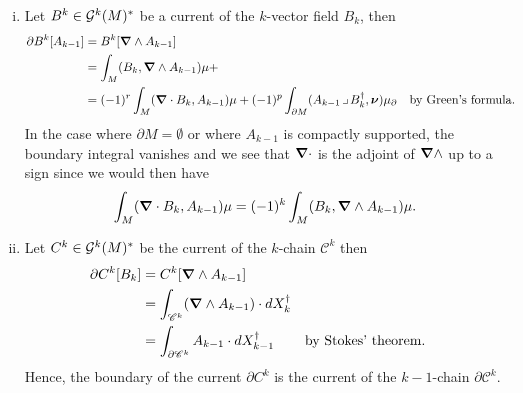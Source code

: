 \documentclass{article}
\begin{document}
\begin{enumerate}[i.]
    \item Let $B^{k}\in \mathcal{G}^k(M)^*$ be a current of the $k$-vector field $B_{k}$, then 
\begin{align}
    \partial B^k[A_{k-1}]&= B^k[\boldsymbol{\nabla} \wedge A_{k-1}]\\
    &= \int_M(B_k,\boldsymbol{\nabla} \wedge A_{k-1}) \mu + \\
    &=(-1)^r \int_M(\boldsymbol{\nabla} \cdot B_k, A_{k-1}) \mu + (-1)^p \int_{\partial M} (A_{k-1} \hspace*{.5mm}\lrcorner \hspace*{.5mm} B_k^\dagger,\boldsymbol{\nu}) \mu_\partial && \textrm{by Green's formula.}
\end{align}
In the case where $\partial M = \emptyset$ or where $A_{k-1}$ is compactly supported, the boundary integral vanishes and we see that $\boldsymbol{\nabla} \cdot$ is the adjoint of $\boldsymbol{\nabla} \wedge$ up to a sign since we would then have
\begin{equation}
\int_M (\boldsymbol{\nabla} \cdot B_k,A_{k-1}) \mu= (-1)^k \int_M (B_k,\boldsymbol{\nabla} \wedge A_{k-1}) \mu.
\end{equation}

    \item Let $C^k \in \mathcal{G}^k(M)^*$ be the current of the $k$-chain $\mathscr{C}^k$ then 
    \begin{align}
        \partial C^k [B_k]&= C^k[\boldsymbol{\nabla} \wedge A_{k-1}]\\
            &= \int_{\mathscr{C}^k} (\boldsymbol{\nabla} \wedge A_{k-1}) \cdot dX_k^\dagger\\
            &= \int_{\partial \mathscr{C}^k} A_{k-1} \cdot dX_{k-1}^\dagger && \textrm{by Stokes' theorem.}
    \end{align}
    Hence, the boundary of the current $\partial C^k$ is the current of the $k-1$-chain $\partial \mathscr{C}^k$.
    
\end{enumerate}


\end{document}
